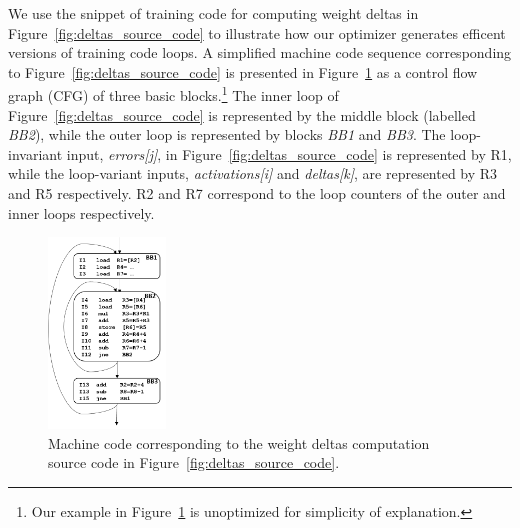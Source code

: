 We use the snippet of training code for computing weight deltas in Figure~\ref{fig:deltas_source_code} to illustrate how our optimizer generates efficent versions of training code loops.   A simplified machine code sequence corresponding to  Figure~\ref{fig:deltas_source_code}  is presented in Figure~\ref{fig:deltas_machine_code} as a control flow graph (CFG) of three basic blocks.\footnote{Our example in Figure~\ref{fig:deltas_machine_code} is unoptimized for simplicity of explanation.}  The inner loop of Figure~\ref{fig:deltas_source_code} is represented by the middle block (labelled {\it BB2}), while the outer loop is represented by blocks {\it BB1} and {\it BB3}.  The loop-invariant input, {\it errors[j]}, in Figure~\ref{fig:deltas_source_code} is represented by R1, while the loop-variant inputs, {\it activations[i]} and {\it deltas[k]}, are represented by R3 and R5 respectively. R2 and R7 correspond to the loop counters of the outer and inner loops respectively. 

\begin{figure}[h]
\centering
\includegraphics[height=2in]{Figures/weight-delta-code.png}
\caption{Machine code corresponding to the weight deltas computation source code in Figure~\ref{fig:deltas_source_code}.}
\label{fig:deltas_machine_code}
\end{figure}


